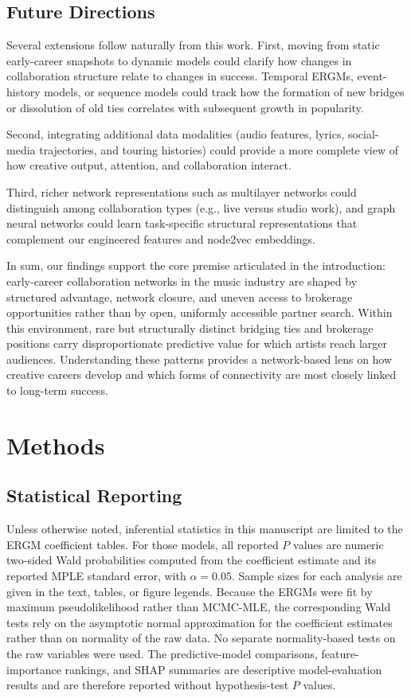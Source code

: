 \documentclass[fleqn,10pt]{wlscirep}
\begin{document}
\subsection*{Future Directions}

Several extensions follow naturally from this work. First, moving from static early-career snapshots to dynamic models could clarify how changes in collaboration structure relate to changes in success. Temporal ERGMs, event-history models, or sequence models could track how the formation of new bridges or dissolution of old ties correlates with subsequent growth in popularity.

Second, integrating additional data modalities (audio features, lyrics, social-media trajectories, and touring histories) could provide a more complete view of how creative output, attention, and collaboration interact.

Third, richer network representations such as multilayer networks could distinguish among collaboration types (e.g., live versus studio work), and graph neural networks could learn task-specific structural representations that complement our engineered features and node2vec embeddings.

In sum, our findings support the core premise articulated in the introduction: early-career collaboration networks in the music industry are shaped by structured advantage, network closure, and uneven access to brokerage opportunities rather than by open, uniformly accessible partner search. Within this environment, rare but structurally distinct bridging ties and brokerage positions carry disproportionate predictive value for which artists reach larger audiences. Understanding these patterns provides a network-based lens on how creative careers develop and which forms of connectivity are most closely linked to long-term success.

\section*{Methods}

\subsection*{Statistical Reporting}
Unless otherwise noted, inferential statistics in this manuscript are limited to the ERGM coefficient tables. For those models, all reported $P$ values are numeric two-sided Wald probabilities computed from the coefficient estimate and its reported MPLE standard error, with $\alpha = 0.05$. Sample sizes for each analysis are given in the text, tables, or figure legends. Because the ERGMs were fit by maximum pseudolikelihood rather than MCMC-MLE, the corresponding Wald tests rely on the asymptotic normal approximation for the coefficient estimates rather than on normality of the raw data. No separate normality-based tests on the raw variables were used. The predictive-model comparisons, feature-importance rankings, and SHAP summaries are descriptive model-evaluation results and are therefore reported without hypothesis-test $P$ values.
\end{document}

